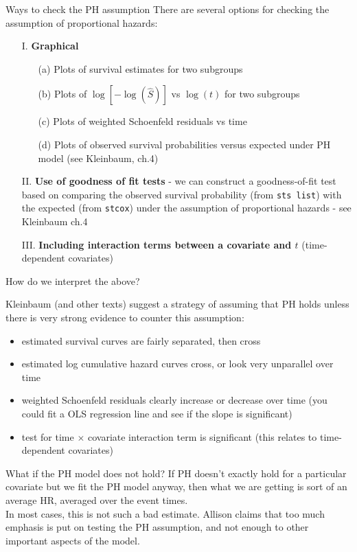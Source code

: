 \documentclass[envcountsect, 10pt, portrait, palatino]{beamer}
\begin{document}
\begin{frame}{Ways to check the PH assumption}
There are several options for checking the assumption of
proportional hazards:

\begin{itemize}
\item[I.] {\bf Graphical}
\begin{itemize}
\item[(a)] Plots of survival estimates for two subgroups
\item[(b)] Plots of $\log[-\log(\hat{S})]$ vs $\log(t)$ for two subgroups
\item[(c)] Plots of weighted Schoenfeld residuals vs time
\item[(d)] Plots of observed survival probabilities versus expected under
PH model (see Kleinbaum, ch.4)
\end{itemize}

\item[II.] {\bf Use of goodness of fit tests} - we can construct a
goodness-of-fit test based on comparing the observed survival
probability (from {\tt sts list}) with the expected (from {\tt stcox})
under the assumption of proportional hazards - see Kleinbaum ch.4

\item[III.] {\bf Including interaction terms between a covariate and $t$}
(time-dependent covariates)
\end{itemize}
\end{frame}
\begin{frame}{ How do we interpret the above?}

Kleinbaum (and other texts) suggest a strategy of assuming that PH
holds unless there is very strong evidence to counter this assumption:
\begin{itemize}
\item estimated survival curves are fairly separated, then cross
\item estimated log cumulative hazard curves cross, or look very
unparallel over time
\item weighted Schoenfeld residuals clearly increase or decrease over
time (you could fit a OLS regression line and see if the slope is
significant)
\item test for time $\times$ covariate interaction term is significant
(this relates to time-dependent covariates)
\end{itemize}
\end{frame}
\begin{frame}{What if the PH model does not hold?}
If PH doesn't exactly hold for a particular covariate but we fit the
PH model anyway, then what we are getting is sort of an average HR,
averaged over the event times.
\\[2ex]
In most cases, this is not such a bad estimate.  Allison claims that
too much emphasis is put on testing the PH assumption, and not enough
to other important aspects of the model.
\end{frame}
\end{document}
